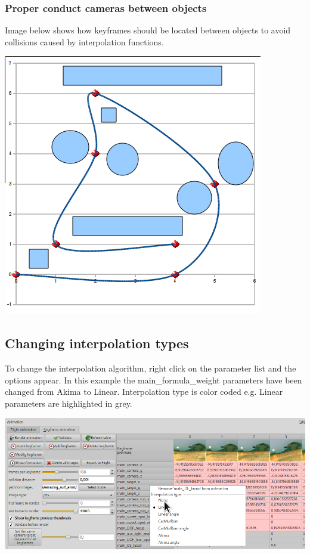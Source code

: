 \subsubsection{Proper conduct cameras between
	objects}\label{proper-conduct-cameras-between-objects}

Image below shows how keyframes should be located between objects to avoid collisions caused by interpolation functions.
\nopagebreak  

\includegraphics[width=0.4\linewidth]{img/manual/media/catmull-rom_example.png}

\subsection{Changing interpolation types}\label{changing-interpolation-types}

To change the interpolation algorithm, right click on the parameter list and the
options appear. In this example the main\_formula\_weight parameters have been
changed from Akima to Linear. Interpolation type is color coded e.g. Linear
parameters are highlighted in grey.

\includegraphics[width=\linewidth]{img/manual/media/change_interpolation_type.png}
